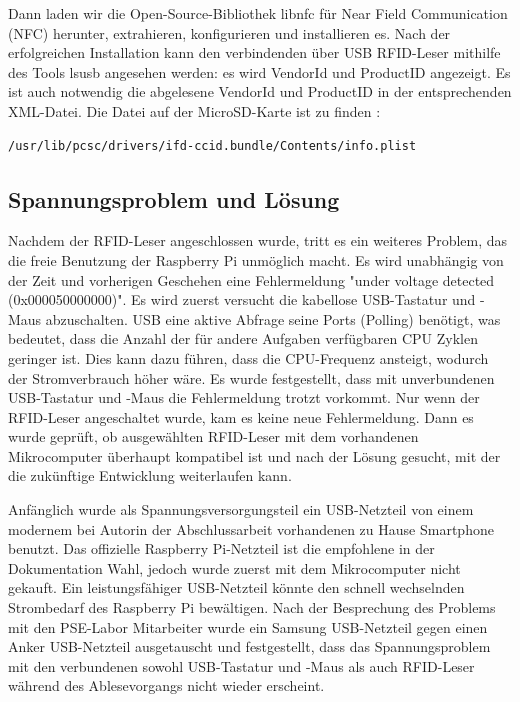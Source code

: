 Dann laden wir die Open-Source-Bibliothek libnfc für Near Field Communication (NFC) herunter, extrahieren, konfigurieren und installieren es. Nach der erfolgreichen Installation kann den verbindenden über USB RFID-Leser mithilfe des Tools lsusb angesehen werden: es wird VendorId und ProductID angezeigt. Es ist auch notwendig die abgelesene VendorId und ProductID in der entsprechenden XML-Datei. Die Datei auf der MicroSD-Karte ist zu finden :
\begin{lstlisting}
/usr/lib/pcsc/drivers/ifd-ccid.bundle/Contents/info.plist
\end{lstlisting}

\subsection{Spannungsproblem und Lösung}
\label{sec:register_client:voltage_issue}
Nachdem der RFID-Leser angeschlossen wurde, tritt es ein weiteres Problem, das die freie Benutzung der Raspberry Pi unmöglich macht. Es wird unabhängig von der Zeit und vorherigen Geschehen eine Fehlermeldung "under voltage detected (0x000050000000)". Es wird zuerst versucht die kabellose USB-Tastatur und -Maus abzuschalten. USB eine aktive Abfrage seine Ports (Polling) benötigt, was bedeutet, dass die Anzahl der für andere Aufgaben verfügbaren CPU Zyklen geringer ist. Dies kann dazu führen, dass die CPU-Frequenz ansteigt, wodurch der Stromverbrauch höher wäre. Es wurde festgestellt, dass mit unverbundenen USB-Tastatur und -Maus die Fehlermeldung trotzt vorkommt. Nur wenn der RFID-Leser angeschaltet wurde, kam es keine neue Fehlermeldung. Dann es wurde geprüft, ob ausgewählten RFID-Leser mit dem vorhandenen Mikrocomputer überhaupt kompatibel ist und nach der Lösung gesucht, mit der die zukünftige Entwicklung weiterlaufen kann.    

Anfänglich wurde als Spannungsversorgungsteil ein USB-Netzteil von einem modernem bei Autorin der Abschlussarbeit vorhandenen zu Hause Smartphone benutzt. Das offizielle Raspberry Pi-Netzteil ist die empfohlene in der Dokumentation Wahl, jedoch wurde zuerst mit dem Mikrocomputer nicht gekauft. Ein leistungsfähiger USB-Netzteil könnte den schnell wechselnden Strombedarf des Raspberry Pi bewältigen. Nach der Besprechung des Problems mit den PSE-Labor Mitarbeiter wurde ein Samsung USB-Netzteil gegen einen Anker USB-Netzteil ausgetauscht und festgestellt, dass das Spannungsproblem mit den verbundenen sowohl USB-Tastatur und -Maus als auch RFID-Leser während des Ablesevorgangs nicht wieder erscheint. 

